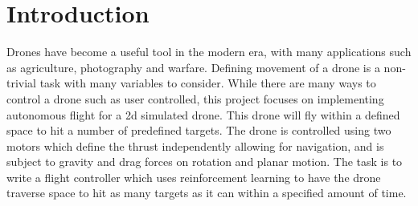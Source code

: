 \section{Introduction}
Drones have become a useful tool in the modern era, with many applications such as agriculture, photography and warfare. Defining movement of a drone is a non-trivial task with many variables to consider. While there are many ways to control a drone such as user controlled, this project focuses on implementing autonomous flight for a 2d simulated drone. This drone will fly within a defined space to hit a number of predefined targets. The drone is controlled using two motors which define the thrust independently allowing for navigation, and is subject to gravity and drag forces on rotation and planar motion. The task is to write a flight controller which uses reinforcement learning to have the drone traverse space to hit as many targets as it can within a specified amount of time.
